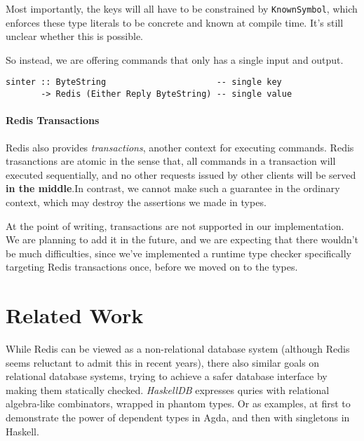 \documentclass[pldi]{sigplanconf-pldi16}
\begin{document}
Most importantly, the keys will all have to be constrained by
 \texttt{KnownSymbol}, which enforces these type literals to be
 concrete and known at compile time.
 It's still unclear whether this is possible.

So instead, we are offering commands that only has a single input and output.

\begin{verbatim}
sinter :: ByteString                      -- single key
       -> Redis (Either Reply ByteString) -- single value
\end{verbatim}

\paragraph{Redis Transactions}

Redis also provides \emph{transactions}, another context for executing commands.
Redis trasanctions are atomic in the sense that, all commands in a transaction
 will executed sequentially, and no other requests issued by other clients will
 be served \textbf{in the middle}.\footnotemark In contrast, we cannot make such
 a guarantee in the ordinary context, which may destroy the assertions we made
 in types.

At the point of writing, transactions are not supported in our implementation.
 We are planning to add it in the future, and we are expecting that there
 wouldn't be much difficulties, since we've implemented a runtime type checker
 specifically targeting Redis transactions once, before we moved on to the
 types.


\section{Related Work}

While Redis can be viewed as a non-relational database system (although Redis
 seems reluctant to admit this in recent years), there also similar goals on
 relational database systems, trying to achieve a safer database interface by
 making them statically checked.
 \emph{HaskellDB}\cite{haskelldb}\cite{haskelldbimproved} expresses quries
 with relational algebra-like combinators, wrapped in phantom types. Or as
 examples, at first to demonstrate the power of dependent types in
 Agda\cite{pi}, and then with singletons in Haskell\cite{singletons}.
\end{document}
